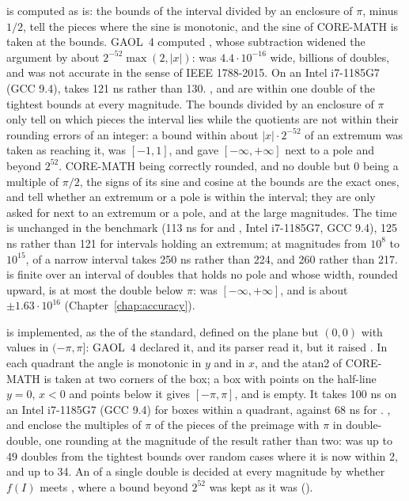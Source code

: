  is computed as  is: the bounds of the interval
divided by an enclosure of $\pi$, minus $1/2$, tell the pieces where the sine
is monotonic, and the sine of CORE-MATH is taken at the bounds.\newinvfive{}
GAOL~4 computed , whose subtraction widened the
argument by about $2^{-52} \max(2, |x|)$:  was
$4.4 \cdot 10^{-16}$ wide, billions of doubles, and  was not
accurate in the sense of IEEE 1788-2015. On an Intel i7-1185G7 (GCC 9.4),
 takes 121 ns rather than 130. ,  and
 are within one double of the tightest bounds at every
magnitude. The bounds divided by an enclosure of $\pi$ only tell on which
pieces the interval lies while the quotients are not within their rounding
errors of an integer: a bound within about $|x| \cdot 2^{-52}$ of an extremum
was taken as reaching it,  was $[-1, 1]$, and
 gave $[-\infty, +\infty]$ next to a pole and beyond $2^{52}$.
CORE-MATH being correctly rounded, and no double but 0 being a multiple of
$\pi/2$, the signs of its sine and cosine at the bounds are the exact ones,
and tell whether an extremum or a pole is within the interval; they are only
asked for next to an extremum or a pole, and at the large magnitudes. The
time is unchanged in the benchmark (113 ns for  and ,
Intel i7-1185G7, GCC 9.4), 125 ns rather than 121 for intervals holding an
extremum; at magnitudes from $10^8$ to $10^{15}$,  of a narrow
interval takes 250 ns rather than 224, and  260 rather than 217.
 is finite over an interval of doubles that holds no pole and
whose width, rounded upward, is at most the double below $\pi$:  was
$[-\infty, +\infty]$, and is about $\pm 1.63 \cdot 10^{16}$
(Chapter~\ref{chap:accuracy}).

\medskip
{} is implemented, as the  of the standard,
defined on the plane but $(0, 0)$ with values in $(-\pi, \pi]$: GAOL~4
declared it, and its parser read it, but it raised
.\newinvfive{} In each quadrant the angle
is monotonic in $y$ and in $x$, and the atan2 of CORE-MATH is taken at two
corners of the box; a box with points on the half-line $y = 0$, $x < 0$ and
points below it gives $[-\pi, \pi]$, and  is empty. It
takes 100 ns on an Intel i7-1185G7 (GCC 9.4) for boxes within a quadrant,
against 68 ns for . ,  and
 enclose the multiples of $\pi$ of the pieces of the
preimage with $\pi$ in double-double, one rounding at the magnitude of the
result rather than two:  was up to 49 doubles from the
tightest bounds over random cases where it is now within 2, and
 up to 34. An  of a single double is decided at
every magnitude by whether $f(I)$ meets , where a bound beyond
$2^{52}$ was kept as it was ().

